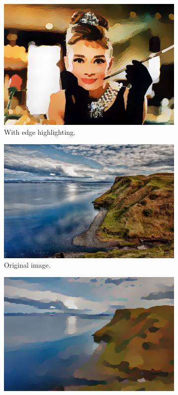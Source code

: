 \documentclass[abstracton]{scrreprt}
\begin{document}
\begin{figure}[!ht]
\begin{subfigure}[b]{0.32\textwidth}
                    \includegraphics[width=\textwidth]{img/cartooning/best_pwc_hepburn_eh.png}
                    \caption{With edge highlighting.}
                \end{subfigure}
                \begin{subfigure}[b]{0.32\textwidth}
                    \includegraphics[width=\textwidth]{img/images/landscape.png}
                    \caption{Original image.}
                \end{subfigure}
                \begin{subfigure}[b]{0.32\textwidth}
                    \includegraphics[width=\textwidth]{img/cartooning/best_pwc_landscape.png}

\end{subfigure}
\end{figure}
\end{document}

